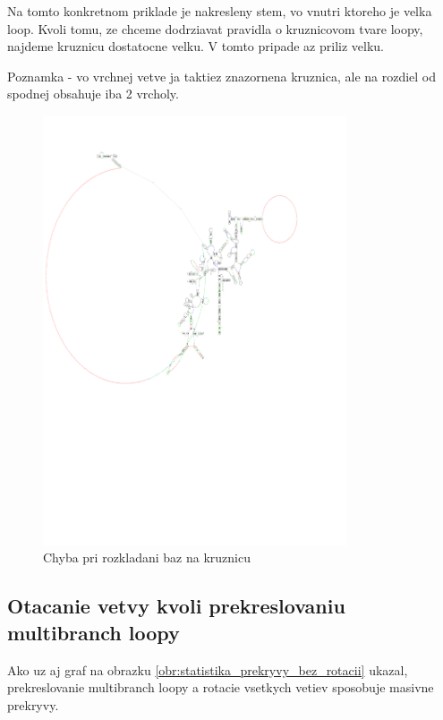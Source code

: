 Na tomto konkretnom priklade je nakresleny stem, vo vnutri ktoreho je velka loop. Kvoli tomu,
ze chceme dodrziavat pravidla o kruznicovom tvare loopy, najdeme kruznicu dostatocne velku.
V tomto pripade az priliz velku.

Poznamka - vo vrchnej vetve ja taktiez znazornena kruznica, ale na rozdiel od spodnej obsahuje iba 2 vrcholy.

\begin{figure}[H]
  \includegraphics[clip, trim=0 10cm 3cm 2cm,width=0.8\textwidth]{../img/chyby/african_frog-echinococcus_granulosus}
  \caption{Chyba pri rozkladani baz na kruznicu}
  \label{obr:chyba_rozlozenie_loopy}
\end{figure}

\subsection{Otacanie vetvy kvoli prekreslovaniu multibranch loopy}

Ako uz aj graf na obrazku \ref{obr:statistika_prekryvy_bez_rotacii} ukazal,
prekreslovanie multibranch loopy a rotacie vsetkych vetiev sposobuje masivne prekryvy.

